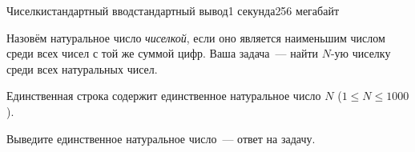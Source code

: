 \begin{problem}{Чиселки}{стандартный ввод}{стандартный вывод}{1 секунда}{256 мегабайт}

Назовём натуральное число \textit{чиселкой}, если оно является наименьшим числом среди всех чисел с той же суммой цифр. Ваша задача~--- найти $N$-ую чиселку среди всех натуральных чисел.

\InputFile
Единственная строка содержит единственное натуральное число $N$ ($1\le N\le 1000$).

\OutputFile
Выведите единственное натуральное число~--- ответ на задачу.

\Examples

\begin{example}
%
%
\end{example}

\end{problem}

